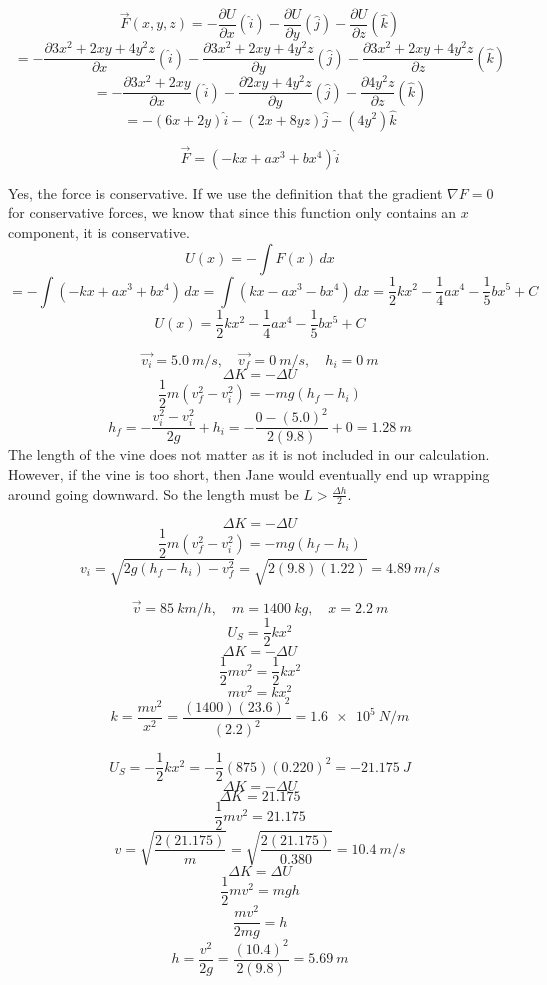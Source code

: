 \documentclass[11pt]{homework}
\begin{document}
\question
\[
\vec{F}(x,y,z)=-\frac{\partial U}{\partial x}(\hat{i})-\frac{\partial U}{\partial y}(\hat{j})-\frac{\partial U}{\partial z}(\hat{k})
\]
\[
=-\frac{\partial 3x^2+2xy+4y^2z}{\partial x}(\hat{i})-\frac{\partial 3x^2+2xy+4y^2z}{\partial y}(\hat{j})-\frac{\partial 3x^2+2xy+4y^2z}{\partial z}(\hat{k})
\]
\[
=-\frac{\partial 3x^2+2xy}{\partial x}(\hat{i})-\frac{\partial 2xy+4y^2z}{\partial y}(\hat{j})-\frac{\partial 4y^2z}{\partial z}(\hat{k})
\]
\[
    =\boxed{-(6x+2y) \hat{i} - (2x + 8yz)\hat{j}-(4y^2)\hat{k}}
\]


\question
\[
    \vec{F}=(-kx+ax^3+bx^4)\hat{i}
\]
\begin{alphaparts}
    \questionpart
        Yes, the force is conservative. If we use the definition that the gradient $\nabla F = 0$ for conservative forces, we know that since this function only contains an $x$ component, it is conservative.
    \questionpart
    \[
    U(x)=-\int  F(x)\,dx
    \]
    \[
        =-\int(-kx+ax^3+bx^4)\, dx = \int(kx-ax^3-bx^4)\, dx = \frac{1}{2}kx^2 - \frac{1}{4}ax^4-\frac{1}{5}bx^5 + C
    \]
    \[
        U(x) = \boxed{\frac{1}{2}kx^2 - \frac{1}{4}ax^4-\frac{1}{5}bx^5 + C}
    \]
\end{alphaparts}


\setcounter{questionCounter}{11}
\question
\[
    \vec{v_i} = \qty{5.0}{m/s}, \quad \vec{v_f}=\qty{0}{m/s}, \quad h_i = \qty{0}{m}
\]
\[
\Delta K = - \Delta U
\]
\[
    \frac{1}{2}m(v_f^2-v_i^2)=-mg(h_f-h_i)
\]
\[
    h_f=-\frac{v_i^2-v_i^2}{2g}+h_i=-\frac{0-(5.0)^2}{2(9.8)}+0=\boxed{\qty{1.28}{m}}
\]
The length of the vine does not matter as it is not included in our calculation. However, if the vine is too short, then Jane would eventually end up wrapping around going downward. So the length must be $L>\frac{\Delta h}{2}$.


\question
\[
\Delta K = - \Delta U
\]\[
\frac{1}{2}m(v_f^2-v_i^2)=-mg(h_f-h_i)
\]
\[
    v_i = \sqrt{2g(h_f-h_i)-v_f^2} = \sqrt{2(9.8)(1.22)} = \boxed{\qty{4.89}{m/s}}
\]


\setcounter{questionCounter}{16}
\question
\[
    \vec{v}=\qty{85}{km/h}, \quad m=\qty{1400}{kg}, \quad x=\qty{2.2}{m}
\]\[
U_S = \frac{1}{2}kx^2
\]
\[
\Delta K = - \Delta U
\]
\[
    \frac{1}{2}mv^2 = \frac{1}{2}kx^2
\]
\[
mv^2 = kx^2 
\]
\[
    k=\frac{mv^2}{x^2}=\frac{(1400)(23.6)^2}{(2.2)^2}=\boxed{\qty{1.6e5}{N/m}}
\]



\setcounter{questionCounter}{18}
\question
\begin{alphaparts}
    \questionpart
\[
    U_S = -\frac{1}{2}kx^2 = -\frac{1}{2}(875)(0.220)^2 = \qty{-21.175}{J}
\]
\[
\Delta K = - \Delta U
\]
\[
\Delta K = 21.175
\]
\[
    \frac{1}{2}mv^2 = 21.175
\]
\[
    v = \sqrt{\frac{2(21.175)}{m}} =  \sqrt{\frac{2(21.175)}{0.380}} = \boxed{\qty{10.4}{m/s}}
\]
    \questionpart
    \[
    \Delta K = \Delta U
    \]\[
    \frac{1}{2}mv^2 = mgh
    \]
    \[
    \frac{mv^2}{2mg}=h
    \]
    \[
        h = \frac{v^2}{2g}=\frac{(10.4)^2}{2(9.8)}
    = \boxed{\qty{5.69}{m}}
    \]
    

\end{alphaparts}
\end{document}
